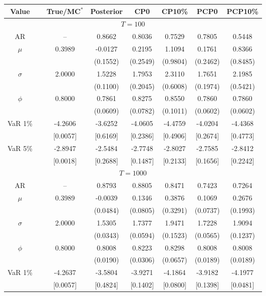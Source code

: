 { \renewcommand{\arraystretch}{1.2} 
\begin{table} 
\center 
\begin{tabular}{cc cccccc} 
Value & & True/MC$^*$ & Posterior & CP0  & CP10\% & PCP0  & PCP10\% \\ \hline 
\hline 
\multicolumn{8}{c}{$T =100$}  \\ 
\hline 
AR && -- & 0.8662 & 0.8036 & 0.7529 & 0.7805 & 0.5448 \\  
$\mu$&& 0.3989 & -0.0127 & 0.2195 & 1.1094 & 0.1761 & 0.8366 \\ 
&&   & (0.1552) & (0.2549) & (0.9804) & (0.2462) & (0.8485) \\ 
$\sigma$&& 2.0000 & 1.5228 & 1.7953 & 2.3110 & 1.7651 & 2.1985 \\ 
&&   & (0.1100) & (0.2045) & (0.6008) & (0.1974) & (0.5421) \\ 
$\phi$&& 0.8000 & 0.7861 & 0.8275 & 0.8550 & 0.7860 & 0.7860 \\ 
&&   & (0.0609) & (0.0782) & (0.1011) & (0.0602) & (0.0602) \\ 
VaR 1\% && -4.2606 & -3.6252 & -4.0605 & -4.4759 & -4.0204 & -4.4368 \\ 
  && [0.0057] & [0.6169] & [0.2386] & [0.4906] & [0.2674] & [0.4773] \\ 
VaR 5\% && -2.8947 & -2.5484 & -2.7748 & -2.8027 & -2.7585 & -2.8412 \\ 
 && [0.0018] & [0.2688] & [0.1487] & [0.2133] & [0.1656] & [0.2242] \\ 
\hline 
\multicolumn{8}{c}{$T =1000$}  \\ 
\hline 
AR && -- & 0.8793 & 0.8805 & 0.8471 & 0.7423 & 0.7264 \\  
$\mu$&& 0.3989 & -0.0039 & 0.1346 & 0.3876 & 0.1069 & 0.2676 \\ 
&&   & (0.0484) & (0.0805) & (0.3291) & (0.0737) & (0.1993) \\ 
$\sigma$&& 2.0000 & 1.5305 & 1.7377 & 1.9471 & 1.7228 & 1.9094 \\ 
&&   & (0.0343) & (0.0594) & (0.1523) & (0.0565) & (0.1237) \\ 
$\phi$&& 0.8000 & 0.8008 & 0.8223 & 0.8298 & 0.8008 & 0.8008 \\ 
&&   & (0.0190) & (0.0306) & (0.0657) & (0.0189) & (0.0189) \\ 
VaR 1\% && -4.2637 & -3.5804 & -3.9271 & -4.1864 & -3.9182 & -4.1977 \\ 
  && [0.0057] & [0.4824] & [0.1402] & [0.0800] & [0.1398] & [0.0481] \\ 

\end{tabular}
\end{table}}
